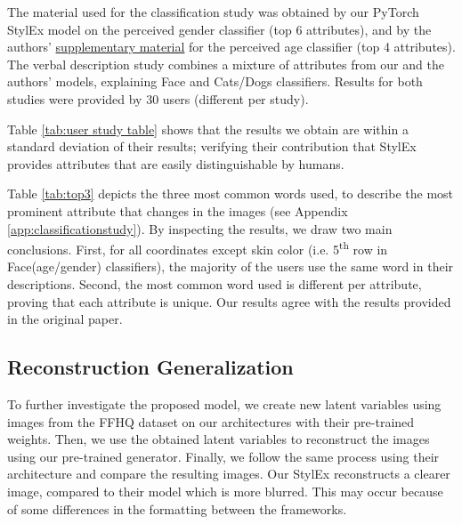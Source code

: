 The material used for the classification study was obtained by our PyTorch StylEx model on the perceived gender classifier (top 6 attributes), and by the authors' \href{https://explaining-in-style.github.io/supmat.html}{supplementary material}  for the perceived age classifier (top 4 attributes). The verbal description study combines a mixture of attributes from our and the authors' models, explaining Face and Cats/Dogs classifiers. Results for both studies were provided by 30 users (different per study).

Table \ref{tab:user study table} shows that the results we obtain are within a standard deviation of their results; verifying their contribution that StylEx provides attributes that are easily distinguishable by humans. 

Table \ref{tab:top3} depicts the three most common words used, to describe the most prominent attribute that changes in the images (see Appendix \ref{app:classificationstudy}). By inspecting the results, we draw two main conclusions. First, for all coordinates except skin color (i.e. 5\textsuperscript{th} row in Face(age/gender) classifiers), the majority of the users use the same word in their descriptions. Second, the most common word used is different per attribute, proving that each attribute is unique. Our results agree with the results provided in the original paper.

 
\subsection{Reconstruction Generalization}

To further investigate the proposed model, we create new latent variables using images from the FFHQ dataset on our architectures with their pre-trained weights. Then, we use the obtained latent variables to reconstruct the images using our pre-trained generator. Finally, we follow the same process using their architecture and compare the resulting images. Our StylEx reconstructs a clearer image, compared to their model which is more blurred. This may occur because of some differences in the formatting between the frameworks.

